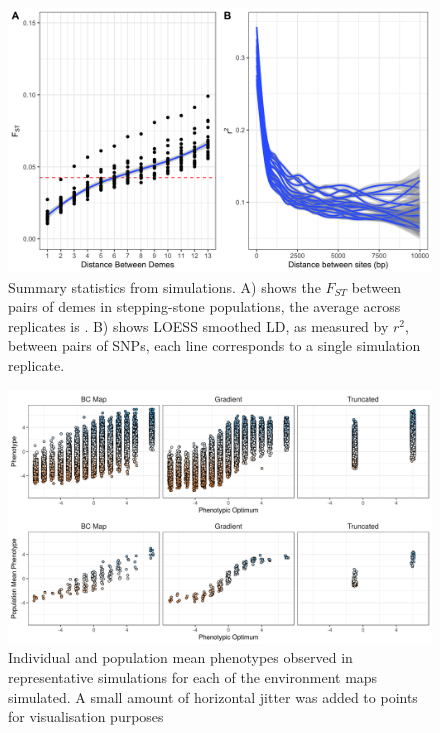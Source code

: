 \documentclass[10pt,twoside,lineno, twocolumn]{GSA_format}
\begin{document}
\begin{figure}[H]
  \includegraphics[width=\textwidth,height=0.75\textheight,keepaspectratio]{../SimulationStudy/directionalSelection/SummaryStats.png}
  \caption{Summary statistics from simulations. A) shows the $F_{ST}$ between pairs of demes in stepping-stone populations, the average across replicates is . B) shows LOESS smoothed LD, as measured by $r^2$, between pairs of SNPs, each line corresponds to a single simulation replicate.}

  \label{fig:summaryStats}
\end{figure}

\pagebreak

\begin{figure}[H]
  \includegraphics[width=\textwidth,height=0.75\textheight,keepaspectratio]{Plots/PhenotypePlot.png}
  \caption{Individual and population mean phenotypes observed in representative simulations for each of the environment maps simulated. A small amount of horizontal jitter was added to points for visualisation purposes}

  \label{fig:localAdaptationPhenotypes}
\end{figure}
\end{document}
